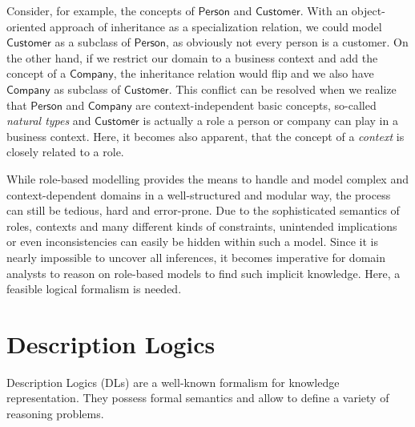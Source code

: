 Consider, for example, the concepts of $\mathsf{Person}$ and $\mathsf{Customer}$. With an
object-oriented approach of inheritance as a specialization relation, we could model
$\mathsf{Customer}$ as a subclass of $\mathsf{Person}$, as obviously not every person is a customer.
On the other hand, if we restrict our domain to a business context and add the concept of a
$\mathsf{Company}$, the inheritance relation would flip and we also have $\mathsf{Company}$ as
subclass of $\mathsf{Customer}$.  This conflict can be resolved when we realize that
$\mathsf{Person}$ and $\mathsf{Company}$ are context-independent basic concepts, so-called
\emph{natural types} and $\mathsf{Customer}$ is actually a role a person or company can play in a
business context. Here, it becomes also apparent, that the concept of a \emph{context} is closely
related to a role.

While role-based modelling provides the means to handle and model complex and context-dependent
domains in a well-structured and modular way, the process can still be tedious, hard and
error-prone. Due to the sophisticated semantics of roles, contexts and many different kinds of
constraints, unintended implications or even inconsistencies can easily be hidden within such a
model. Since it is nearly impossible to uncover all inferences, it becomes imperative for domain
analysts to reason on role-based models to find such implicit knowledge.  Here, a feasible logical
formalism is needed.

\section{Description Logics}
\label{sec:intro-description-logics}

Description Logics (DLs) \cite{DLhandbook-07} are a well-known formalism for knowledge
representation. They possess formal semantics and allow to define a variety of reasoning problems.

